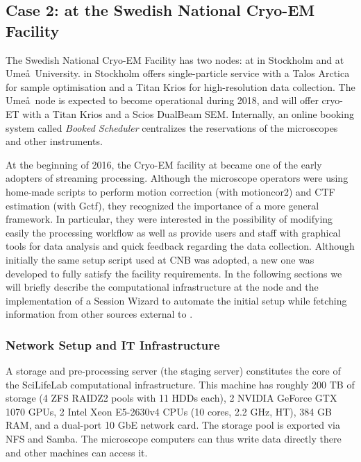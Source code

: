 
\subsection{Case 2: \scipion at the Swedish National Cryo-EM Facility}

The Swedish National Cryo-EM Facility %
has two nodes: at \scilifelab in Stockholm and at Ume\aa\ University. \scilifelab in Stockholm offers single-particle service with a 
Talos Arctica for sample optimisation and a Titan Krios for high-resolution data collection. The Ume\aa\ node is expected to become operational during 2018, and will offer cryo-ET with a Titan Krios and a Scios DualBeam SEM.
Internally, an online booking system called \emph{Booked Scheduler} centralizes the reservations of the microscopes and other instruments. 

At the beginning of 2016, the Cryo-EM facility at \scilifelab became one of the early adopters of \scipion streaming processing. Although the microscope operators were using home-made scripts to perform motion correction (with motioncor2) and CTF estimation (with Gctf), they recognized the importance of a more general
framework. In particular, they were interested in the possibility of modifying easily the processing workflow as well as provide users and staff with  graphical tools for data analysis and quick feedback regarding the data collection.
Although initially the same setup script used at
CNB was adopted, a new one was developed to fully satisfy the facility
requirements. In the following sections we will briefly describe the computational infrastructure at the \scilifelab node and the implementation of a Session Wizard to automate the initial setup while fetching information from other sources external to \scipion. %

\subsubsection{Network Setup and IT Infrastructure}
A storage and pre-processing server (the staging
server) constitutes the core of the SciLifeLab computational infrastructure.
 This machine has roughly 200 TB of storage (4 ZFS RAIDZ2 pools with 11 HDDs each), 2 NVIDIA GeForce GTX 1070 GPUs, 2 Intel Xeon E5-2630v4 CPUs (10 cores, 2.2 GHz, HT), 384 GB RAM, and a dual-port 10 GbE network card. The storage pool is exported via NFS and Samba. The microscope computers can thus write data directly there and other machines can access it.
 

